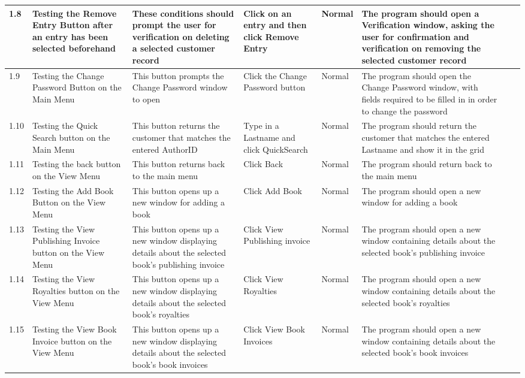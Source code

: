\begin{landscape}
\begin{center}
\begin{longtable}{|p{1.5cm}|p{2.5cm}|p{2.5cm}|p{2cm}|p{2cm}|p{2cm}|p{2cm}|p{2cm}|}
        1.8 & Testing the Remove Entry Button after an entry has been selected beforehand & These conditions should prompt the user for verification on deleting a selected customer record & Click on an entry and then click Remove Entry & Normal & The program should open a Verification window, asking the user for confirmation and verification on removing the selected customer record & & \\ \hline
        1.9 & Testing the Change Password Button on the Main Menu & This button prompts the Change Password window to open & Click the Change Password button & Normal & The program should open the Change Password window, with fields required to be filled in in order to change the password & & \\ \hline
        1.10 & Testing the Quick Search button on the Main Menu & This button returns the customer that matches the entered AuthorID & Type in a Lastname and click QuickSearch & Normal & The program should return the customer that matches the entered Lastname and show it in the grid & & \\ \hline
        1.11 & Testing the back button on the View Menu & This button returns back to the main menu & Click Back & Normal & The program should return back to the main menu & & \\ \hline
        1.12 & Testing the Add Book Button on the View Menu & This button opens up a new window for adding a book & Click Add Book & Normal & The program should open a new window for adding a book & & \\ \hline
        1.13 & Testing the View Publishing Invoice button on the View Menu & This button opens up a new window displaying details about the selected book's publishing invoice & Click View Publishing invoice & Normal & The program should open a new window containing details about the selected book's publishing invoice & & \\ \hline
        1.14 & Testing the View Royalties button on the View Menu & This button opens up a new window displaying details about the selected book's royalties & Click View Royalties & Normal & The program should open a new window containing details about the selected book's royalties & & \\ \hline
        1.15 & Testing the View Book Invoice button on the View Menu & This button opens up a new window displaying details about the selected book's book invoices & Click View Book Invoices & Normal & The program should open a new window containing details about the selected book's book invoices & & \\ \hline

\end{longtable}
\end{center}
\end{landscape}
